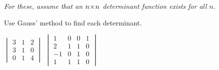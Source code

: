 \begin{exercises}
  \item[{\em For these, assume that an $n \! \times \! n$ determinant
      function exists for all $n$.}]
  \recommended \item 
    Use Gauss' method to find each determinant.
    \begin{exparts*}
      \partsitem \( \begin{vmatrix}
                 3  &1  &2  \\
                 3  &1  &0  \\
                 0  &1  &4
               \end{vmatrix} \)
      \partsitem \( \begin{vmatrix}
                 1  &0  &0  &1 \\
                 2  &1  &1  &0 \\
                -1  &0  &1  &0 \\
                 1  &1  &1  &0
               \end{vmatrix} \)
    \end{exparts*}
    \begin{answer}
\end{answer}
\end{exercises}
